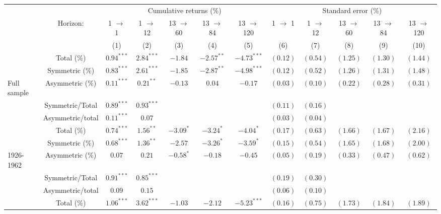 \documentclass[
]{article}
\begin{document}
\begin{tabular}{lccccccccccc}
   \toprule & & \multicolumn{5}{c}{Cumulative returns (\%)} & \multicolumn{5}{c}{Standard error (\%)} \\
 \cmidrule(l){2-7} \cmidrule(l){8-12} & Horizon: & 1 $\rightarrow$ 1 & 1 $\rightarrow$ 12 & 13 $\rightarrow$ 60 & 13 $\rightarrow$ 84 & 13 $\rightarrow$ 120 & 1 $\rightarrow$ 1 & 1 $\rightarrow$ 12 & 13 $\rightarrow$ 60 & 13 $\rightarrow$ 84 & 13 $\rightarrow$ 120 \\ 
   \cmidrule(l){3-7} \cmidrule(l){8-12} \vspace{5pt} &  & (1) & (2) & (3) & (4) & (5) & (6) & (7) & (8) & (9) & (10) \\ 
   & Total (\%) & $0.94^{***}$ & $2.84^{***}$ & $-1.84$ & $-2.57^{**}$ & $-4.73^{***}$ & $(0.12)$ & $(0.54)$ & $(1.25)$ & $(1.30)$ & $(1.44)$ \\ 
   & Symmetric (\%) & $0.83^{***}$ & $2.61^{***}$ & $-1.85$ & $-2.87^{**}$ & $-4.98^{***}$ & $(0.12)$ & $(0.52)$ & $(1.26)$ & $(1.31)$ & $(1.48)$ \\ 
   \vspace{5pt}Full sample & Asymmetric (\%) & $0.11^{***}$ & $0.21^{**}$ & $-0.13$ & $0.04$ & $-0.17$ & $(0.03)$ & $(0.10)$ & $(0.22)$ & $(0.28)$ & $(0.31)$ \\ 
   & Symmetric/Total & $0.89^{***}$ & $0.93^{***}$ &  &  &  & $(0.11)$ & $(0.16)$ &  &  &  \\ 
   \vspace{5pt} & Asymmetric/total & $0.11^{***}$ & $0.07$ &  &  &  & $(0.03)$ & $(0.04)$ &  &  &  \\ 
   \hline & Total (\%) & $0.74^{***}$ & $1.56^{**}$ & $-3.09^{*}$ & $-3.24^{*}$ & $-4.04^{*}$ & $(0.17)$ & $(0.63)$ & $(1.66)$ & $(1.67)$ & $(2.16)$ \\ 
   & Symmetric (\%) & $0.68^{***}$ & $1.36^{**}$ & $-2.57$ & $-3.26^{*}$ & $-3.59^{*}$ & $(0.15)$ & $(0.54)$ & $(1.65)$ & $(1.68)$ & $(2.00)$ \\ 
   \vspace{5pt}1926-1962 & Asymmetric (\%) & $0.07$ & $0.21$ & $-0.58^{*}$ & $-0.18$ & $-0.45$ & $(0.05)$ & $(0.19)$ & $(0.33)$ & $(0.47)$ & $(0.62)$ \\ 
   & Symmetric/Total & $0.91^{***}$ & $0.85^{***}$ &  &  &  & $(0.19)$ & $(0.30)$ &  &  &  \\ 
   \vspace{5pt} & Asymmetric/total & $0.09$ & $0.15$ &  &  &  & $(0.06)$ & $(0.10)$ &  &  &  \\ 
   \hline & Total (\%) & $1.06^{***}$ & $3.62^{***}$ & $-1.03$ & $-2.12$ & $-5.23^{***}$ & $(0.16)$ & $(0.75)$ & $(1.73)$ & $(1.84)$ & $(1.89)$ \\ 

\end{tabular}
\end{document}
